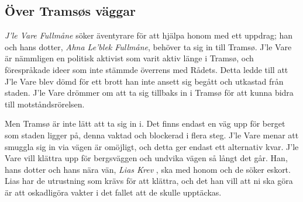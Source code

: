\subsection{Över Tramsøs väggar}
\label{OverTramsosVaggar}
\textit{J'le Vare Fullmåne} söker äventyrare för att hjälpa honom med ett uppdrag; han och hans dotter, \textit{Ahna Le'blek Fullmåne}, behöver ta sig in till Tramsø. J'le Vare är nämmligen en politisk aktivist som varit aktiv länge i Tramsø, och förespråkade ideer som inte stämmde överrens med Rådets. Detta ledde till att J'le Vare blev dömd för ett brott han inte ansett sig begått och utkastad från staden. J'le Vare drömmer om att ta sig tillbaks in i Tramsø för att kunna bidra till motståndsrörelsen.

Men Tramsø är inte lätt att ta sig in i. Det finns endast en väg upp för berget som staden ligger på, denna vaktad och blockerad i flera steg. J'le Vare menar att smuggla sig in via vägen är omöjligt, och detta ger endast ett alternativ kvar. J'le Vare vill klättra upp för bergsväggen och undvika vägen så långt det går. Han, hans dotter och hans nära vän, \textit{Lias Krev} \sectiondescribe{\ref{liasKrev}}, ska med honom och de söker eskort. Lias har de utrustning som krävs för att klättra, och det han vill att ni ska göra är att oskadligöra vakter i det fallet att de skulle upptäckas.